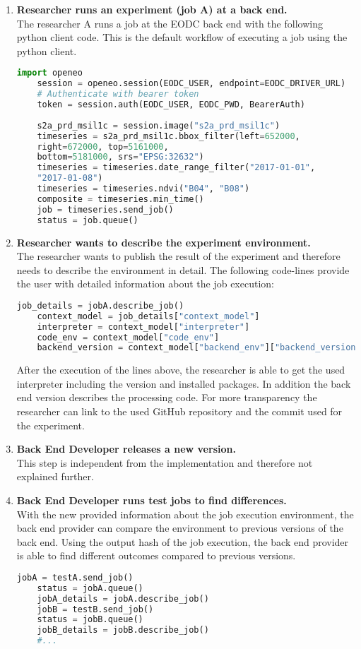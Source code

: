\documentclass[draft,final]{vutinfth} %
\begin{document}
\begin{enumerate}
	\item \textbf{Researcher runs an experiment (job A) at a back end.}\\
	The researcher A runs a job at the EODC back end with the following python client code. This is the default workflow of executing a job using the python client.  
	\begin{lstlisting}[frame=single, language=Python]
	import openeo
	session = openeo.session(EODC_USER, endpoint=EODC_DRIVER_URL)
	# Authenticate with bearer token
	token = session.auth(EODC_USER, EODC_PWD, BearerAuth)
	
	s2a_prd_msil1c = session.image("s2a_prd_msil1c")
	timeseries = s2a_prd_msil1c.bbox_filter(left=652000, 
	right=672000, top=5161000,
	bottom=5181000, srs="EPSG:32632")
	timeseries = timeseries.date_range_filter("2017-01-01", 
	"2017-01-08")
	timeseries = timeseries.ndvi("B04", "B08")
	composite = timeseries.min_time()
	job = timeseries.send_job()
	status = job.queue()
	\end{lstlisting}
	\item \textbf{Researcher wants to describe the experiment environment.}\\
	The researcher wants to publish the result of the experiment and therefore needs to describe the environment in detail. The following code-lines provide the user with detailed information about the job execution:
	\begin{lstlisting}[frame=single, language=Python]
	job_details = jobA.describe_job()
	context_model = job_details["context_model"]
	interpreter = context_model["interpreter"]
	code_env = context_model["code_env"]
	backend_version = context_model["backend_env"]["backend_version"]
	\end{lstlisting}
	After the execution of the lines above, the researcher is able to get the used interpreter including the version and installed packages. In addition the back end version describes the processing code. For more transparency the researcher can link to the used GitHub repository and the commit used for the experiment. 
	
	\item \textbf{Back End Developer releases a new version.} \\
	This step is independent from the implementation and therefore not explained further.
	
	\item \textbf{Back End Developer runs test jobs to find differences.}\\
	With the new provided information about the job execution environment, the back end provider can compare the environment to previous versions of the back end. Using the output hash of the job execution, the back end provider is able to find different outcomes compared to previous versions. 
	\begin{lstlisting}[frame=single, language=Python]
	jobA = testA.send_job()
	status = jobA.queue()
	jobA_details = jobA.describe_job()
	jobB = testB.send_job()
	status = jobB.queue()
	jobB_details = jobB.describe_job()
	#...
	\end{lstlisting}
\end{enumerate}
\end{document}
